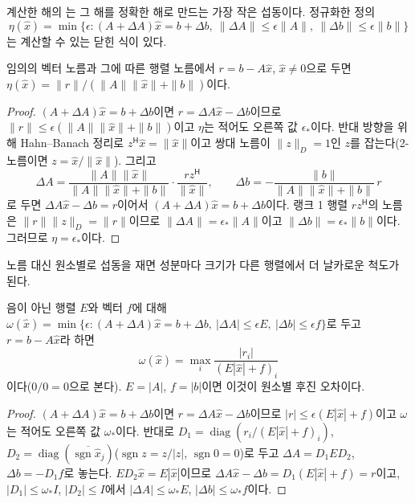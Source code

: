 계산한 해의 는 그 해를 정확한 해로 만드는 가장 작은 섭동이다. 정규화한 정의
\[
\eta(\hat x)=\min\{\epsilon:(A+\Delta A)\hat x=b+\Delta b,\ \|\Delta A\|\le\epsilon\|A\|,\ \|\Delta b\|\le\epsilon\|b\|\}
\]
는 계산할 수 있는 닫힌 식이 있다.

\begin{theorem}
\label{thm:lu-rigal-gaches}
임의의 벡터 노름과 그에 따른 행렬 노름에서 $r=b-A\hat x$, $\hat x\ne0$으로 두면 $\eta(\hat x)=\|r\|/(\|A\|\|\hat x\|+\|b\|)$이다.
\end{theorem}

\begin{proof}
$(A+\Delta A)\hat x=b+\Delta b$이면 $r=\Delta A\hat x-\Delta b$이므로 $\|r\|\le\epsilon(\|A\|\|\hat x\|+\|b\|)$이고 $\eta$는 적어도 오른쪽 값 $\epsilon_\ast$이다. 반대 방향을 위해 Hahn--Banach 정리로 $z^{\mathsf H}\hat x=\|\hat x\|$이고 쌍대 노름이 $\|z\|_D=1$인 $z$를 잡는다(2-노름이면 $z=\hat x/\|\hat x\|$). 그리고
\[
\Delta A=\frac{\|A\|\|\hat x\|}{\|A\|\|\hat x\|+\|b\|}\cdot\frac{rz^{\mathsf H}}{\|\hat x\|},\qquad
\Delta b=-\frac{\|b\|}{\|A\|\|\hat x\|+\|b\|}\,r
\]
로 두면 $\Delta A\hat x-\Delta b=r$이어서 $(A+\Delta A)\hat x=b+\Delta b$이다. 랭크 1 행렬 $rz^{\mathsf H}$의 노름은 $\|r\|\|z\|_D=\|r\|$이므로 $\|\Delta A\|=\epsilon_\ast\|A\|$이고 $\|\Delta b\|=\epsilon_\ast\|b\|$이다. 그러므로 $\eta=\epsilon_\ast$이다.
\end{proof}

노름 대신 원소별로 섭동을 재면 성분마다 크기가 다른 행렬에서 더 날카로운 척도가 된다.

\begin{theorem}
\label{thm:lu-oettli-prager}
음이 아닌 행렬 $E$와 벡터 $f$에 대해 $\omega(\hat x)=\min\{\epsilon:(A+\Delta A)\hat x=b+\Delta b,\ |\Delta A|\le\epsilon E,\ |\Delta b|\le\epsilon f\}$로 두고 $r=b-A\hat x$라 하면
\[
\omega(\hat x)=\max_i\frac{|r_i|}{(E|\hat x|+f)_i}
\]
이다($0/0=0$으로 본다). $E=|A|$, $f=|b|$이면 이것이 원소별 후진 오차이다.
\end{theorem}

\begin{proof}
$(A+\Delta A)\hat x=b+\Delta b$이면 $r=\Delta A\hat x-\Delta b$이므로 $|r|\le\epsilon(E|\hat x|+f)$이고 $\omega$는 적어도 오른쪽 값 $\omega_\ast$이다. 반대로 $D_1=\operatorname{diag}(r_i/(E|\hat x|+f)_i)$, $D_2=\operatorname{diag}(\overline{\operatorname{sgn}\hat x_j})$($\operatorname{sgn}z=z/|z|$, $\operatorname{sgn}0=0$)로 두고 $\Delta A=D_1ED_2$, $\Delta b=-D_1f$로 놓는다. $ED_2\hat x=E|\hat x|$이므로 $\Delta A\hat x-\Delta b=D_1(E|\hat x|+f)=r$이고, $|D_1|\le\omega_\ast I$, $|D_2|\le I$에서 $|\Delta A|\le\omega_\ast E$, $|\Delta b|\le\omega_\ast f$이다.
\end{proof}


